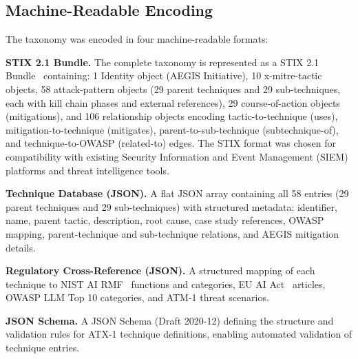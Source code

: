 \documentclass{IEEEoj-data}
\newcommand{\replaced}[2]{#1}
\newcommand{\added}[1]{#1}
\newcommand{\deleted}[1]{}
\begin{document}
\subsection*{Machine-Readable Encoding}

The taxonomy was encoded in four machine-readable formats:

{\bf STIX 2.1 Bundle.} The complete taxonomy is represented as a STIX 2.1 Bundle~\cite{ref7} containing: 1 Identity object (AEGIS Initiative), \replaced{10}{9} x-mitre-tactic objects, \replaced{58}{20} attack-pattern objects (\replaced{29 parent techniques and 29 sub-techniques, each with kill chain phases and external references}{one per technique with kill chain phases and external references}), \replaced{29}{20} course-of-action objects (mitigations), and \replaced{106 relationship objects encoding tactic-to-technique (uses), mitigation-to-technique (mitigates), parent-to-sub-technique (subtechnique-of), and technique-to-OWASP (related-to) edges}{54 relationship objects: 20 tactic-to-technique (uses), 20 mitigation-to-technique (mitigates), and 14 technique-to-OWASP (related-to)}. The STIX format was chosen for compatibility with existing Security Information and Event Management (SIEM) platforms and threat intelligence tools.

{\bf Technique Database (JSON).} A flat JSON array containing all \replaced{58 entries (29 parent techniques and 29 sub-techniques)}{20 techniques} with structured metadata: identifier, name, parent tactic, description, \deleted{severity, }root cause, case study references, OWASP mapping, \added{parent-technique and sub-technique relations, }and AEGIS mitigation details.

{\bf Regulatory Cross-Reference (JSON).} A structured mapping of each technique to NIST AI RMF~\cite{ref8} functions and categories, EU AI Act~\cite{ref9} articles, OWASP LLM Top 10 categories, and ATM-1 threat scenarios.

{\bf JSON Schema.} A JSON Schema (Draft 2020-12) defining the structure and validation rules for ATX-1 technique definitions, enabling automated validation of technique entries.
\end{document}
